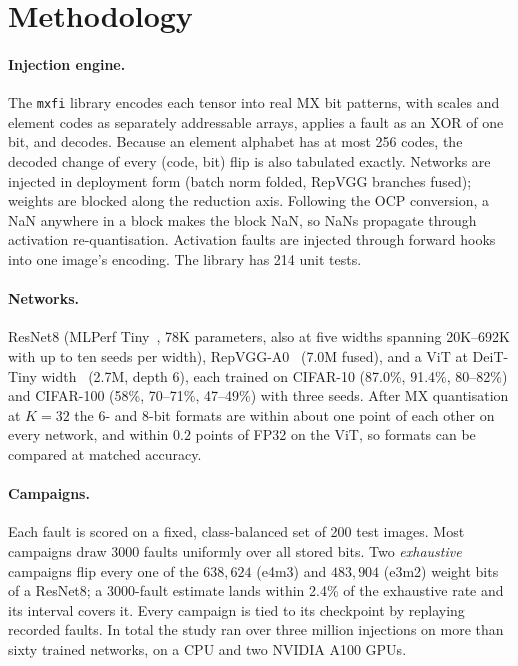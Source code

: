 \documentclass[10pt,a4paper]{article}
\begin{document}
\section{Methodology}

\paragraph{Injection engine.} The \texttt{mxfi} library encodes each tensor into real MX bit
patterns, with scales and element codes as separately addressable arrays, applies a fault as an
XOR of one bit, and decodes. Because an element alphabet has at most 256 codes, the decoded
change of every (code, bit) flip is also tabulated exactly. Networks are injected in deployment
form (batch norm folded, RepVGG branches fused); weights are blocked along the reduction axis.
Following the OCP conversion, a NaN anywhere in a block makes the block NaN, so NaNs propagate
through activation re-quantisation. Activation faults are injected through forward hooks into
one image's encoding. The library has 214 unit tests.

\paragraph{Networks.} ResNet8 (MLPerf Tiny~\cite{banbury2021mlperftiny}, 78K parameters, also
at five widths spanning 20K--692K with up to ten seeds per width), RepVGG-A0~\cite{ding2021repvgg}
(7.0M fused), and a ViT at DeiT-Tiny width~\cite{touvron2021deit} (2.7M, depth 6), each trained
on CIFAR-10 (87.0\%, 91.4\%, 80--82\%) and CIFAR-100 (58\%, 70--71\%, 47--49\%) with three seeds.
After MX quantisation at $K=32$ the 6- and 8-bit formats are within about one point of each
other on every network, and within $0.2$ points of FP32 on the ViT, so formats can be compared at
matched accuracy.

\paragraph{Campaigns.} Each fault is scored on a fixed, class-balanced set of 200 test images.
Most campaigns draw 3000 faults uniformly over all stored bits. Two \emph{exhaustive} campaigns
flip every one of the $638{,}624$ (e4m3) and $483{,}904$ (e3m2) weight bits of a ResNet8; a
3000-fault estimate lands within 2.4\% of the exhaustive rate and its interval covers it. Every
campaign is tied to its checkpoint by replaying recorded faults. In total the study ran over three
million injections on more than sixty trained networks, on a CPU and two NVIDIA A100 GPUs.
\end{document}
